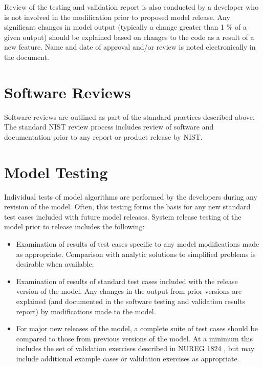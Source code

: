 Review of the testing and validation report is also conducted by a developer who is not involved in the modification prior to proposed model release. Any significant changes in model output (typically a change greater than 1 \% of a given output) should be explained based on changes to the code as a result of a new feature.  Name and date of approval and/or review is noted electronically in the document.

\section{Software Reviews}

Software reviews are outlined as part of the standard practices described above.  The standard NIST review process includes review of software and documentation prior to any report or product release by NIST.

\section{Model Testing}

Individual tests of model algorithms are performed by the developers during any revision of the model. Often, this testing forms the basis for any new standard test cases included with future model releases. System release testing of the model prior to release includes the following:

\begin{itemize}
\item Examination of results of test cases specific to any model modifications made as appropriate.  Comparison with analytic solutions to simplified problems is desirable when available.

\item Examination of results of standard test cases included with the release version of the model. Any changes in the output from prior versions are explained (and documented in the software testing and validation results report) by modifications made to the model.

\item For major new releases of the model, a complete suite of test cases should be compared to those from previous versions of the model.  At a minimum this includes the set of validation exercises described in NUREG 1824 \cite{NRCNUREG1824}, but may include additional example cases or validation exercises as appropriate.
\end{itemize}

